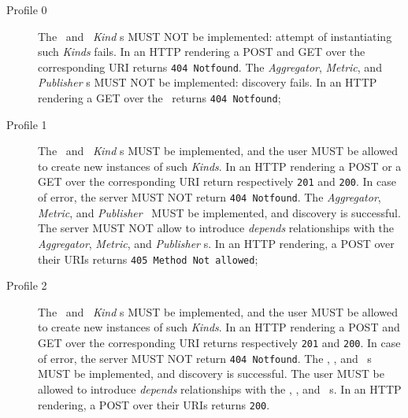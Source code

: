 \documentclass[10pt,a4paper]{article}
\begin{document}
\begin{description}

\item[Profile 0] The \coll\ and \sens\ {\em Kind} s MUST NOT be implemented: attempt of instantiating such {\em Kinds} fails.  In an HTTP rendering a POST and GET over the corresponding URI returns {\tt 404 Notfound}. The {\em Aggregator}, {\em Metric}, and {\em Publisher} \mi s MUST NOT be implemented: discovery fails. In an HTTP rendering a GET over the \mi\ returns {\tt 404 Notfound}; 

\item[Profile 1] The \coll\ and \sens\ {\em Kind} s MUST be implemented, and the user MUST be allowed to create new instances of such {\em Kinds}.  In an HTTP rendering a POST or a GET over the corresponding URI return respectively {\tt 201} and {\tt 200}. In case of error, the server MUST NOT return {\tt 404 Notfound}. The {\em Aggregator}, {\em Metric}, and {\em Publisher} \mi\ MUST be implemented, and discovery is successful. The server MUST NOT allow to introduce {\em depends} relationships with the {\em Aggregator}, {\em Metric}, and {\em Publisher} \mi s. In an HTTP rendering, a POST over their URIs returns {\tt 405 Method Not allowed}; 

\item[Profile 2]  The \coll\ and \sens\ {\em Kind} s MUST be implemented, and the user MUST be allowed to create new instances of such {\em Kinds}.  In an HTTP rendering a POST and GET over the corresponding URI returns respectively {\tt 201} and {\tt 200}. In case of error, the server MUST NOT return {\tt 404 Notfound}. The \aggr , \metr , and \publ\ \mi s MUST be implemented, and discovery is successful. The user MUST be allowed to introduce {\em depends} relationships with the  \aggr , \metr , and \publ\ \mi s. In an HTTP rendering, a POST over their URIs returns {\tt 200}.

\end{description}
\end{document}
